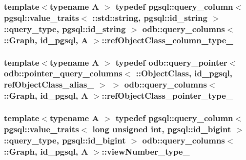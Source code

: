 \subsubsection[{ref\+Object\+Class\+\_\+column\+\_\+type\+\_\+}]{\setlength{\rightskip}{0pt plus 5cm}template$<$typename A $>$ typedef pgsql\+::query\+\_\+column$<$ pgsql\+::value\+\_\+traits$<$ \+::std\+::string, pgsql\+::id\+\_\+string $>$\+::query\+\_\+type, pgsql\+::id\+\_\+string $>$ odb\+::query\+\_\+columns$<$ \+::{\bf Graph}, id\+\_\+pgsql, A $>$\+::{\bf ref\+Object\+Class\+\_\+column\+\_\+type\+\_\+}}\label{structodb_1_1query__columns_3_01_1_1_graph_00_01id__pgsql_00_01_a_01_4_abdd48668c97ac95a12e1fc0d1b49e7ee}
\hypertarget{structodb_1_1query__columns_3_01_1_1_graph_00_01id__pgsql_00_01_a_01_4_a49b77bfafd35519781be11ece1d25911}{}
\subsubsection[{ref\+Object\+Class\+\_\+pointer\+\_\+type\+\_\+}]{\setlength{\rightskip}{0pt plus 5cm}template$<$typename A $>$ typedef odb\+::query\+\_\+pointer$<$ odb\+::pointer\+\_\+query\+\_\+columns$<$ \+::{\bf Object\+Class}, id\+\_\+pgsql, {\bf ref\+Object\+Class\+\_\+alias\+\_\+} $>$ $>$ odb\+::query\+\_\+columns$<$ \+::{\bf Graph}, id\+\_\+pgsql, A $>$\+::{\bf ref\+Object\+Class\+\_\+pointer\+\_\+type\+\_\+}}\label{structodb_1_1query__columns_3_01_1_1_graph_00_01id__pgsql_00_01_a_01_4_a49b77bfafd35519781be11ece1d25911}
\hypertarget{structodb_1_1query__columns_3_01_1_1_graph_00_01id__pgsql_00_01_a_01_4_ab2eead097e6b06f77d6438902addfa9d}{}
\subsubsection[{view\+Number\+\_\+type\+\_\+}]{\setlength{\rightskip}{0pt plus 5cm}template$<$typename A $>$ typedef pgsql\+::query\+\_\+column$<$ pgsql\+::value\+\_\+traits$<$ long unsigned int, pgsql\+::id\+\_\+bigint $>$\+::query\+\_\+type, pgsql\+::id\+\_\+bigint $>$ odb\+::query\+\_\+columns$<$ \+::{\bf Graph}, id\+\_\+pgsql, A $>$\+::{\bf view\+Number\+\_\+type\+\_\+}}\label{structodb_1_1query__columns_3_01_1_1_graph_00_01id__pgsql_00_01_a_01_4_ab2eead097e6b06f77d6438902addfa9d}


